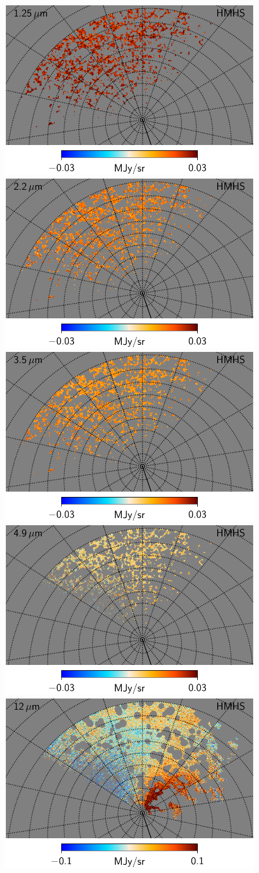 \documentclass{aa}
\begin{document}




\begin{figure}
  \centering
  \includegraphics[width=0.38\linewidth]{figs/CGDR2_01_hmhs_fullres.pdf}\hspace*{5mm}
  \includegraphics[width=0.38\linewidth]{figs/CGDR2_02_hmhs_fullres.pdf}\\
  \includegraphics[width=0.38\linewidth]{figs/CGDR2_03_hmhs_fullres.pdf}\hspace*{5mm}
  \includegraphics[width=0.38\linewidth]{figs/CGDR2_04_hmhs_fullres.pdf}\\
  \includegraphics[width=0.38\linewidth]{figs/CGDR2_05_hmhs_fullres.pdf}\hspace*{5mm}

\end{figure}
\end{document}
